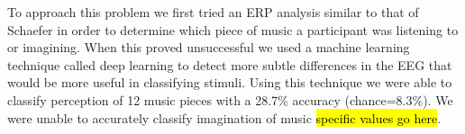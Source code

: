 To approach this problem we first tried an ERP analysis similar to that of Schaefer \etal\cite{schaefer_name_2011} in order to determine which piece of music a participant was listening to or imagining.
When this proved unsuccessful we used a machine learning technique called deep learning to detect more subtle differences in the EEG that would be more useful in classifying stimuli. 
Using this technique we were able to classify perception of 12 music pieces with a 28.7\% accuracy (chance=8.3\%).
We were unable to accurately classify imagination of music \hl{specific values go here}.